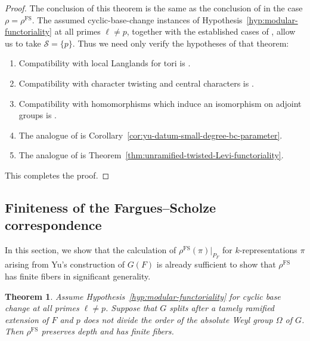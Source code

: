 \documentclass[reqno]{amsart}
\numberwithin{equation}{subsection}
\newcommand\cS{\mathcal{S}}
\DeclareMathOperator{\FS}{FS}
\newtheorem{thm}{Theorem}[subsection]
\theoremstyle{remark}
\numberwithin{equation}{subsection}
\numberwithin{figure}{subsection}
\begin{document}
\begin{proof}
The conclusion of this theorem is the same as the conclusion of \cite[Theorem~10.2.1]{CF26a} in the case $\rho = \rho^{\FS}$. The assumed cyclic-base-change instances of Hypothesis~\ref{hyp:modular-functoriality} at all primes $\ell \neq p$, together with the established cases of \cite[Theorem 1.3.1]{F24}, allow us to take $\cS=\{p\}$. Thus we need only verify the hypotheses of that theorem:
\begin{enumerate}
    \item Compatibility with local Langlands for tori is \cite[Theorem I.9.6(i)]{FS}.
    \item Compatibility with character twisting and central characters is \cite[Theorem I.9.6(ii), (iii)]{FS}.
    \item Compatibility with homomorphisms which induce an isomorphism on adjoint groups is \cite[Theorem I.9.6(v)]{FS}.
    \item The analogue of \cite[Proposition~8.3.1]{CF26a} is Corollary~\ref{cor:yu-datum-small-degree-bc-parameter}.
    \item The analogue of \cite[Theorem~9.3.3]{CF26a} is Theorem~\ref{thm:unramified-twisted-Levi-functoriality}.
\end{enumerate}
This completes the proof.
\end{proof}


\subsection{Finiteness of the Fargues--Scholze correspondence}

In this section, we show that the calculation of $\rho^{\FS}(\pi)|_{P_F}$ for $k$-representations $\pi$ arising from Yu's construction of $G(F)$ is already sufficient to show that $\rho^{\FS}$ has finite fibers in significant generality.

\begin{thm}\label{thm:finiteness-of-fargues-scholze}
Assume Hypothesis~\ref{hyp:modular-functoriality} for cyclic base change at all primes $\ell \neq p$.
Suppose that $G$ splits after a tamely ramified extension of $F$ and $p$ does not divide the order of the absolute Weyl group $\Omega$ of $G$. Then $\rho^{\FS}$ preserves depth and has finite fibers.
\end{thm}
\end{document}
